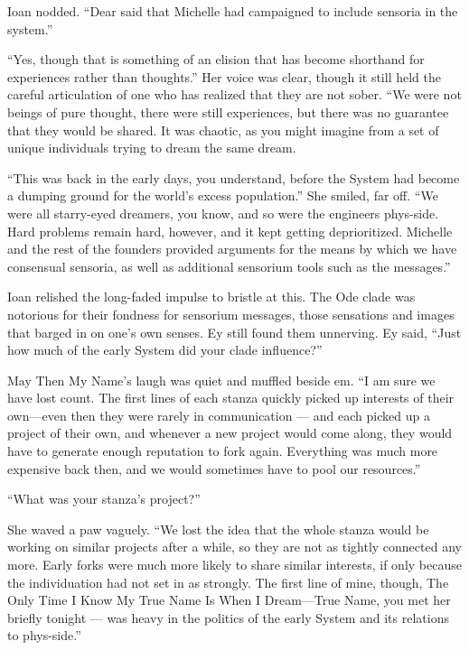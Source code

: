 Ioan nodded. ``Dear said that Michelle had campaigned to include sensoria in the system.''\pagebreak

``Yes, though that is something of an elision that has become shorthand for experiences rather than thoughts.'' Her voice was clear, though it still held the careful articulation of one who has realized that they are not sober. ``We were not beings of pure thought, there were still experiences, but there was no guarantee that they would be shared. It was chaotic, as you might imagine from a set of unique individuals trying to dream the same dream.

``This was back in the early days, you understand, before the System had become a dumping ground for the world's excess population.'' She smiled, far off. ``We were all starry-eyed dreamers, you know, and so were the engineers phys-side. Hard problems remain hard, however, and it kept getting deprioritized. Michelle and the rest of the founders provided arguments for the means by which we have consensual sensoria, as well as additional sensorium tools such as the messages.''

Ioan relished the long-faded impulse to bristle at this. The Ode clade was notorious for their fondness for sensorium messages, those sensations and images that barged in on one's own senses. Ey still found them unnerving. Ey said, ``Just how much of the early System did your clade influence?''

May Then My Name's laugh was quiet and muffled beside em. ``I am sure we have lost count. The first lines of each stanza quickly picked up interests of their own---even then they were rarely in communication — and each picked up a project of their own, and whenever a new project would come along, they would have to generate enough reputation to fork again. Everything was much more expensive back then, and we would sometimes have to pool our resources.''

``What was your stanza's project?''

She waved a paw vaguely. ``We lost the idea that the whole stanza would be working on similar projects after a while, so they are not as tightly connected any more. Early forks were much more likely to share similar interests, if only because the individuation had not set in as strongly. The first line of mine, though, The Only Time I Know My True Name Is When I Dream---True Name, you met her briefly tonight — was heavy in the politics of the early System and its relations to phys-side.''

